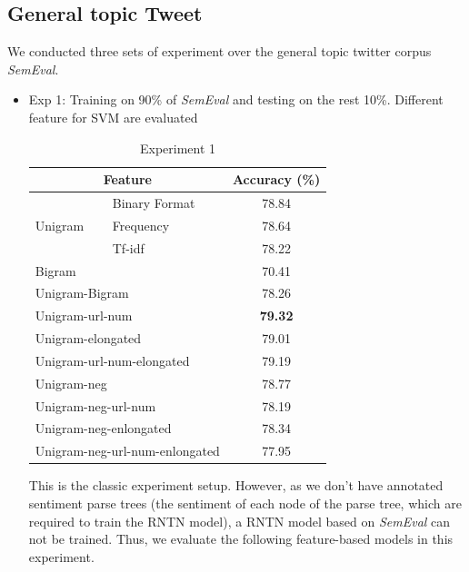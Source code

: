 \subsection{General topic Tweet}
We conducted three sets of experiment over the general topic twitter corpus \textit{SemEval}. 
\begin{itemize}
\item Exp 1: Training on 90\% of \textit{SemEval} and testing on the rest 10\%. Different feature for SVM are evaluated

\begin{table}[H]
  \begin{center}
    \begin{tabular}{llc}\hline
     \multicolumn{2}{c}{Feature} & Accuracy (\%)     \\\hline
     \multirow{3}{*}{Unigram}    & Binary Format  &  78.84  \\ 
                                 & Frequency       &  78.64  \\ 
                                 & Tf-idf          &  78.22 \\
     \multicolumn{2}{l}{Bigram}                    &  70.41 \\  
     \multicolumn{2}{l}{Unigram-Bigram}            &  78.26 \\         
     \multicolumn{2}{l}{Unigram-url-num}           &  \textbf{79.32} \\
     \multicolumn{2}{l}{Unigram-elongated}         &  79.01 \\
     \multicolumn{2}{l}{Unigram-url-num-elongated} &  79.19 \\
     \multicolumn{2}{l}{Unigram-neg}               &  78.77 \\
     \multicolumn{2}{l}{Unigram-neg-url-num}       &  78.19 \\
     \multicolumn{2}{l}{Unigram-neg-enlongated}    &  78.34 \\
     \multicolumn{2}{l}{Unigram-neg-url-num-enlongated}  &  77.95 \\\hline      
    \end{tabular}
    \end{center}
    \caption{\label{exp5_1} Experiment 1}
\end{table}
This is the classic experiment setup. However, as we don't have annotated sentiment parse trees  (the sentiment of each node of the parse tree, which are required to train the RNTN model), a RNTN model based on \textit{SemEval} can not be trained. Thus, we evaluate the following feature-based models in this experiment. 



\end{itemize}
